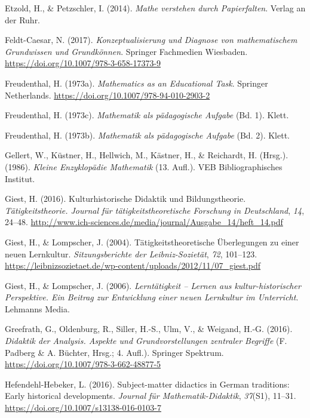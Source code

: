 \documentclass[
]{scrbook}
\newlength{\cslhangindent}
\newenvironment{CSLReferences}[2] %
 {\begin{list}{}{%
  \setlength{\itemindent}{0pt}
  \setlength{\leftmargin}{0pt}
  \setlength{\parsep}{0pt}
  \ifodd #1
   \setlength{\leftmargin}{\cslhangindent}
   \setlength{\itemindent}{-1\cslhangindent}
  \fi
  \setlength{\itemsep}{#2\baselineskip}}}
 {\end{list}}
\theoremstyle{definition}
\theoremstyle{definition}
\theoremstyle{definition}
\theoremstyle{definition}
\theoremstyle{remark}
\begin{document}
\begin{CSLReferences}{1}{0}
Etzold, H., \& Petzschler, I. (2014). \emph{Mathe verstehen durch {Papierfalten}}. Verlag an der Ruhr.

Feldt-Caesar, N. (2017). \emph{Konzeptualisierung und {Diagnose} von mathematischem {Grundwissen} und {Grundkönnen}}. Springer Fachmedien Wiesbaden. \url{https://doi.org/10.1007/978-3-658-17373-9}

Freudenthal, H. (1973a). \emph{Mathematics as an {Educational} {Task}}. Springer Netherlands. \url{https://doi.org/10.1007/978-94-010-2903-2}

Freudenthal, H. (1973c). \emph{Mathematik als pädagogische {Aufgabe}} (Bd. 1). Klett.

Freudenthal, H. (1973b). \emph{Mathematik als pädagogische {Aufgabe}} (Bd. 2). Klett.

Gellert, W., Küstner, H., Hellwich, M., Kästner, H., \& Reichardt, H. (Hrsg.). (1986). \emph{Kleine {Enzyklopädie} {Mathematik}} (13. Aufl.). VEB Bibliographisches Institut.

Giest, H. (2016). Kulturhistorische {Didaktik} und {Bildungstheorie}. \emph{Tätigkeitstheorie. Journal für tätigkeitstheoretische Forschung in Deutschland}, \emph{14}, 24--48. \url{http://www.ich-sciences.de/media/journal/Ausgabe_14/heft_14.pdf}

Giest, H., \& Lompscher, J. (2004). Tätigkeitstheoretische Überlegungen zu einer neuen {Lernkultur}. \emph{Sitzungsberichte der Leibniz-Sozietät}, \emph{72}, 101--123. \url{https://leibnizsozietaet.de/wp-content/uploads/2012/11/07_giest.pdf}

Giest, H., \& Lompscher, J. (2006). \emph{Lerntätigkeit -- {Lernen} aus kultur-historischer {Perspektive}. {Ein} {Beitrag} zur {Entwicklung} einer neuen {Lernkultur} im {Unterricht}}. Lehmanns Media.

Greefrath, G., Oldenburg, R., Siller, H.-S., Ulm, V., \& Weigand, H.-G. (2016). \emph{Didaktik der {Analysis}. {Aspekte} und {Grundvorstellungen} zentraler {Begriffe}} (F. Padberg \& A. Büchter, Hrsg.; 4. Aufl.). Springer Spektrum. \url{https://doi.org/10.1007/978-3-662-48877-5}

Hefendehl-Hebeker, L. (2016). Subject-matter didactics in {German} traditions: {Early} historical developments. \emph{Journal für Mathematik-Didaktik}, \emph{37}(S1), 11--31. \url{https://doi.org/10.1007/s13138-016-0103-7}


\end{CSLReferences}
\end{document}
